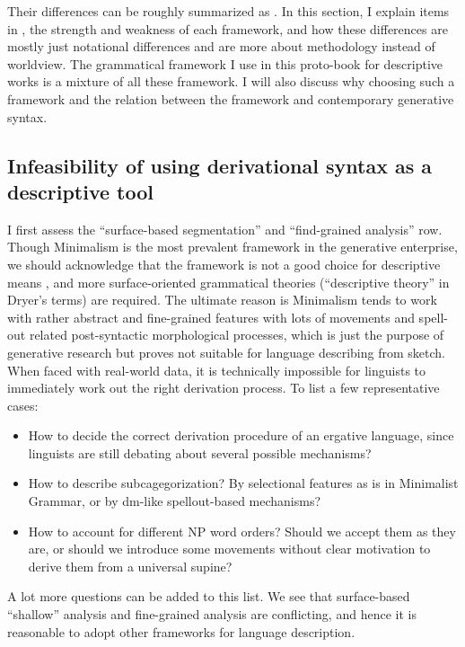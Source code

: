 \documentclass[../main.tex]{subfiles}
\begin{document}
Their differences can be roughly summarized as . 
In this section, I explain items in , the strength and weakness 
of each framework, and how these differences
are mostly just notational differences and are more about methodology instead of worldview. The grammatical framework I use in this proto-book for 
descriptive works is a mixture of all these framework. I will also discuss why choosing such a 
framework and the relation between the framework and contemporary generative syntax.



\subsection{Infeasibility of using derivational syntax as a descriptive tool}\label{sec:generative-no-good}

I first assess the ``surface-based segmentation'' and ``find-grained analysis'' row. 
Though Minimalism is the most prevalent framework in the generative enterprise, we should acknowledge that 
the framework is not a good choice for descriptive means \citep{dryer2006descriptive}, and more surface-oriented
grammatical theories (``descriptive theory'' in Dryer's terms) are required. The ultimate reason is 
Minimalism tends to work with rather abstract and fine-grained features with lots of movements and spell-out related post-syntactic morphological processes, 
which is just the purpose of generative research but proves not suitable for language describing from sketch.
When faced with real-world data, it is technically impossible for linguists to immediately work out the right derivation process. To list a few representative cases:
\begin{itemize}
    \item  How to decide the correct derivation procedure of an ergative language, since 
    linguists are still debating about several possible mechanisms?
    \item How to describe subcagegorization? By selectional features as is in Minimalist Grammar,
    or by \ac{dm}-like spellout-based mechanisms\citep{siddiqi2009syntax}?
    \item How to account for different NP word orders? Should we accept them as they are, or should we introduce 
    some movements without clear motivation \citep{cinque2005deriving} to derive them from a universal supine?
\end{itemize}
A lot more questions can be added to this list. We see that surface-based ``shallow'' analysis and fine-grained 
analysis are conflicting, and hence it is reasonable to adopt other frameworks for language description.
\end{document}
